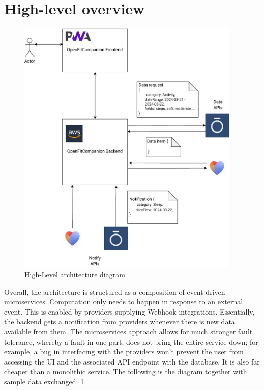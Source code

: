 \section{High-level overview}
\begin{figure}
    
    \centering
    \includegraphics[width=0.95\textwidth,keepaspectratio]{../images/highLevel.pdf}
    \caption{High-Level architecture diagram}
    \label{fig:1}
    
\end{figure}
Overall, the architecture is structured as a composition of event-driven microservices. Computation only needs to happen in response to an external event. This is enabled by providers supplying Webhook integrations. Essentially, the backend gets a notification from providers whenever there is new data available from them. The microservices approach allows for much stronger fault tolerance, whereby a fault in one part, does not bring the entire service down; for example, a bug in interfacing with the providers won't prevent the user from accessing the UI and the associated API endpoint with the database. It is also far cheaper than a monolithic service. The following is the diagram together with sample data exchanged: \ref{fig:1}


